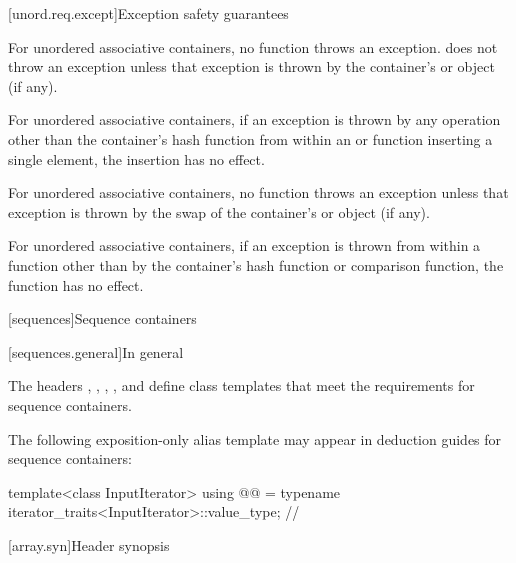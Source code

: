 [unord.req.except]{Exception safety guarantees}

\pnum
{}%
%
For unordered associative containers, no  function
throws an exception.  does not throw an
exception unless that exception is thrown by the container's  or
 object (if any).

\pnum
For unordered associative containers, if an exception is thrown by any
operation other than the container's hash function from within an
 or  function inserting a single element,
the insertion has no effect.

\pnum
For unordered associative containers, no  function throws
an exception unless that exception is thrown by the swap of the container's
 or  object (if any).

\pnum
{}%
%
For unordered associative containers, if an exception is thrown
from within a  function other than by the container's hash
function or comparison function, the  function has no effect.

[sequences]{Sequence containers}

[sequences.general]{In general}

\pnum
The headers
,
,
,
, and
define class templates that meet the requirements for sequence containers.

\pnum
The following exposition-only alias template may appear in deduction guides for sequence containers:

\begin{codeblock}
template<class InputIterator>
  using @@ = typename iterator_traits<InputIterator>::value_type;  // \expos
\end{codeblock}

[array.syn]{Header  synopsis}

